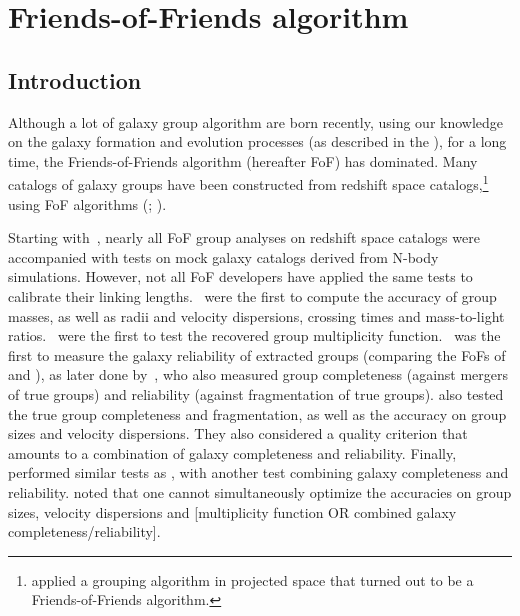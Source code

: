 \def\bpar{$b_\parallel$}
\def\bperp{$b_\bot$}

\chapter{Friends-of-Friends algorithm}
\label{cha:friends_of_friends_algorithm}

\section{Introduction}
\label{sec:fof_introduction}

Although a lot of galaxy group algorithm are born recently, using our knowledge
on the galaxy formation and evolution processes (as described in the
), for a long time, the
Friends-of-Friends algorithm (hereafter FoF) has dominated. Many catalogs of
galaxy groups have been constructed from redshift space
catalogs,\footnote{\cite{TG76} applied a grouping algorithm in projected space
that turned out to be a Friends-of-Friends algorithm.} using FoF algorithms
(\citealp*{HG82,NW87,RGH89,TrasartiBattistoni98,MZ02};
\citealp{Eke+04,Berlind+06,Tago+10,Robotham+11,Tempel+14}).

Starting with~\cite{NW87},  nearly all FoF group analyses on redshift space
catalogs were accompanied with tests on mock galaxy catalogs derived from
N-body simulations. However, not all FoF developers have applied the same tests
to calibrate their linking lengths.~\cite{NW87} were the first to compute the
accuracy of group masses, as well as radii and velocity dispersions, crossing
times and mass-to-light ratios.~\cite{RGH89} were the first to test the
recovered group multiplicity function.~\cite{Frederic95a} was the first to
measure the galaxy reliability of extracted groups (comparing the FoFs of
\citealp{HG82} and \citealp{NW87}), as later done by~\cite{MZ02}, who also
measured group completeness (against mergers of true groups) and reliability
(against fragmentation of true groups). \citet{Eke+04} also tested the true
group completeness and fragmentation, as well as the accuracy on group sizes
and velocity dispersions. They also considered a quality criterion that amounts
to a combination of galaxy completeness and reliability. Finally,
\citet{Berlind+06} performed similar tests as \citeauthor{Eke+04}, with another
test combining galaxy completeness and reliability. \citeauthor{Berlind+06}
noted that one cannot simultaneously optimize the accuracies on group sizes,
velocity dispersions and [multiplicity function OR combined galaxy
completeness/reliability].

